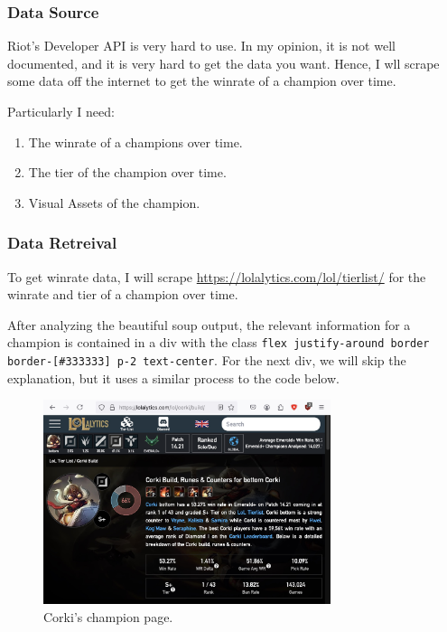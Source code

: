\documentclass{article}
\begin{document}
\subsubsection{Data Source}
\label{subsubsec:Data Source}

Riot's Developer API is very hard to use. In my opinion, it is not well documented, and it is very hard to get the data you want.
Hence, I wll scrape some data off the internet to get the winrate of a champion over time.

Particularly I need:
\begin{enumerate}
  \item The winrate of a champions over time.
  \item The tier of the champion over time.
  \item Visual Assets of the champion.
\end{enumerate}

\subsubsection{Data Retreival} 
\label{subsubsec:Data Retreival}

To get winrate data, I will scrape \url{https://lolalytics.com/lol/tierlist/} for the winrate and tier of a champion over time.

After analyzing the beautiful soup output, the relevant information for a champion 
is contained in a div with the class \texttt{flex justify-around border border-[\#333333] p-2 text-center}.
For the next div, we will skip the explanation, but it uses a similar process to the code below.

\begin{figure}[ht] 
  \centering
  \includegraphics[width=0.75\textwidth]{figs/website.jpg}
  \caption{
      Corki's champion page.
  }
  \label{fig:fig1}
\end{figure}
\end{document}
